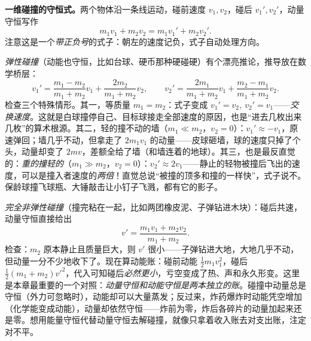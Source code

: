 \begin{center}
\end{center}

\textbf{一维碰撞的守恒式。}两个物体沿一条线运动，碰前速度 \(v_1,v_2\)，碰后 \(v_1',v_2'\)，动量守恒写作
\[
m_1v_1+m_2v_2=m_1v_1'+m_2v_2' .
\]
注意这是一个\emph{带正负号}的式子：朝左的速度记负，式子自动处理方向。

\emph{弹性碰撞}（动能也守恒，比如台球、硬币那种硬碰硬）有个漂亮推论，推导放在数学桥层：
\[
v_1'=\frac{m_1-m_2}{m_1+m_2}v_1+\frac{2m_2}{m_1+m_2}v_2,\qquad
v_2'=\frac{2m_1}{m_1+m_2}v_1+\frac{m_2-m_1}{m_1+m_2}v_2 .
\]
检查三个特殊情形。其一，等质量 \(m_1=m_2\)：式子变成 \(v_1'=v_2,\ v_2'=v_1\)——\emph{交换速度}。这就是白球撞停自己、目标球接走全部速度的原因，也是“进去几枚出来几枚”的算术根源。其二，轻的撞不动的墙（\(m_1\ll m_2\)，\(v_2=0\)）：\(v_1'\approx -v_1\)，原速弹回；墙几乎不动，但拿走了 \(2m_1v_1\) 的动量——皮球砸墙，球的速度只掉了个头，动量却变了 \(2mv\)，差额全给了墙（和墙连着的地球）。其三，也是最反直觉的：\emph{重的撞轻的}（\(m_1\gg m_2\)，\(v_2=0\)）：\(v_2'\approx 2v_1\)——静止的轻物被撞后飞出的速度，可以是撞入者速度的\emph{两倍}！直觉总说“被撞的顶多和撞的一样快”，式子说不。保龄球撞飞球瓶、大锤敲击让小钉子飞溅，都有它的影子。

\emph{完全非弹性碰撞}（撞完粘在一起，比如两团橡皮泥、子弹钻进木块）：碰后共速，动量守恒直接给出
\[
v'=\frac{m_1v_1+m_2v_2}{m_1+m_2}.
\]
检查：\(m_2\) 原本静止且质量巨大，则 \(v'\) 很小——子弹钻进大地，大地几乎不动，但动量一分不少地收下了。现在算动能账：碰前动能 \(\tfrac12 m_1v_1^2\)，碰后 \(\tfrac12(m_1+m_2)v'^2\)，代入可知碰后\emph{必然更小}，亏空变成了热、声和永久形变。这里是本章最重要的一个对照：\emph{动量守恒和动能守恒是两本独立的账}。碰撞中动量总是守恒（外力可忽略时），动能却可以大量蒸发；反过来，炸药爆炸时动能凭空增加（化学能变成动能），动量却依然守恒——炸前为零，炸后各碎片的动量加起来还是零。想用能量守恒代替动量守恒去解碰撞，就像只拿着收入账去对支出账，注定对不平。

